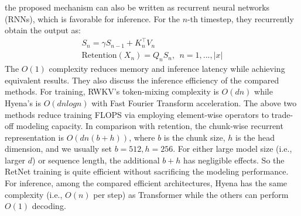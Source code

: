 \documentclass[11pt]{article}
\begin{document}
the proposed mechanism can also be written as recurrent neural networks (RNNs), which is favorable for inference. For the $n$-th timestep, they recurrently obtain the output as:
\begin{equation} \label{inference6}
\begin{split}
S_n = \gamma S_{n-1}+ K^\top_nV_n\\
\text{Retention}(X_n) = Q_nS_n, \ \ n=1,...,|x|
\end{split}
\end{equation}
The $O(1)$ complexity reduces memory and inference latency while achieving equivalent results. They also discuss the inference efficiency of the compared methods. For training, RWKV’s token-mixing complexity is $O(dn)$ while Hyena’s is $O(dn log n)$ with Fast Fourier Transform acceleration. The above two methods reduce training FLOPS via employing element-wise operators to trade-off modeling capacity. In comparison with retention, the chunk-wise recurrent representation is $O(dn(b + h))$, where $b$ is the chunk size, $h$ is the head dimension, and we usually set $b = 512, h = 256$. For either large model size (i.e., larger $d$) or sequence length, the additional $b + h$ has negligible effects. So the RetNet training is quite efficient without sacrificing the modeling performance. For inference, among the compared efficient architectures, Hyena has the same complexity (i.e., $O(n)$ per step) as Transformer while the others can perform $O(1)$ decoding.
\end{document}
